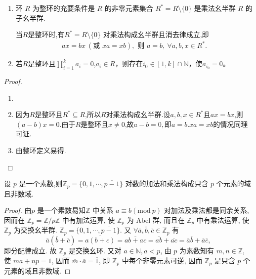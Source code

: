 \documentclass[../../main.tex]{subfiles}%
\begin{document}
\begin{proposition}\label{proposition:整环的一些性质}
\begin{enumerate}[(1)]
\item\label{proposition:整环的一些性质-2}  环 \( R \) 为整环的充要条件是 \( R \) 的非零元素集合 \( R^* = R \setminus \{0\} \) 是乘法幺半群 \( R \) 的子幺半群.

当\( R \)是整环时,有\( R^* = R \setminus \{0\} \) 对乘法构成幺半群且消去律成立,即
\begin{align*}
ax = bx \ (\text{或 } xa = xb), \text{ 则 } a = b, \ \forall a, b, x \in R^*.
\end{align*}

\item\label{proposition:整环的一些性质-3} 若$R$是整环且$\prod_{i=1}^k a_i = 0$,$a_i \in R$，则存在$i_0 \in [1, k] \cap \mathbb{N}$，使$a_{i_0} = 0$。
\end{enumerate}
\end{proposition}
\begin{proof}
\begin{enumerate}[(1)]
\item 

\item 因为$R$是整环且$R^*\subseteq R$,所以$R$对乘法构成幺半群.设$a,b,x\in R^*$且$ax=bx$,则$(a-b)x=0$.由于$R$是整环且$x\ne 0$,故$a-b=0,$即$a=b$.$xa=xb$的情况同理可证.

\item 由整环定义易得.
\end{enumerate}

\end{proof}

\begin{proposition}\label{proposition:Z_p是域且非数域}
设 \( p \) 是一个素数,则\( \mathbb{Z}_p=\{0,1,\cdots,\overline{p-1}\} \) 对数的加法和乘法构成只含 \( p \) 个元素的域且非数域.
\end{proposition}
\begin{proof}

由\( p \) 是一个素数易知\( \mathbb{Z} \) 中关系 \( a \equiv b(\text{mod}\ p) \) 对加法及乘法都是同余关系, 因而在 \( \mathbb{Z}_p = \mathbb{Z}/p\mathbb{Z} \) 中有加法运算, 使 \( \mathbb{Z}_p \) 为 Abel 群, 而且在 \( \mathbb{Z}_p \) 中有乘法运算, 使 \( \mathbb{Z}_p \) 为交换幺半群. \( \mathbb{Z}_p = \{0,1,\cdots,\overline{p-1}\} \). 又 \( \forall \overline{a},\overline{b},\overline{c} \in \mathbb{Z}_p \) 有
\[
\overline{a}(\overline{b} + \overline{c}) = \overline{a(b + c)} = \overline{ab + ac} = \overline{ab} + \overline{ac} = \overline{a}\overline{b} + \overline{a}\overline{c},
\]
即分配律成立. 故 \( \mathbb{Z}_p \) 是交换幺环. 又对 \( a \in \mathbb{N}, a < p \), 由 \( p \) 为素数知有 \( m,n \in \mathbb{Z} \), 使 \( ma + np = 1 \), 因而 \( \overline{m} \cdot \overline{a} = \overline{1} \), 即 \( \mathbb{Z}_p \) 中每个非零元素可逆, 因而 \( \mathbb{Z}_p \) 是只含 \( p \) 个元素的域且非数域.

\end{proof}
\end{document}
